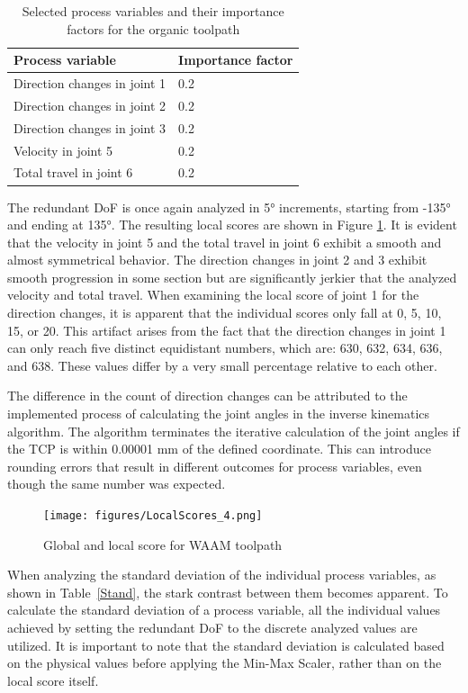 \begin{table}[H]
	\centering
	\caption{Selected process variables and their importance factors for the organic toolpath}
	\begin{tabular}{||l|l||}
		Process variable& Importance factor \\
		\hline
		\hline
		\hline
		Direction changes in joint 1	&		0.2 \\
		Direction changes in joint 2	&		0.2 \\
		Direction changes in joint 3	&		0.2 \\
		Velocity in joint 5	&		0.2 \\
		Total travel in joint 6	&		0.2 \\
		\hline
		\hline
	\end{tabular}
	
	
	\label{ravenparams}
\end{table}

The redundant \acrshort{DoF} is once again analyzed in 5° increments, starting from -135° and ending at 135°. The resulting local scores are shown in Figure \ref{LS4}. It is evident that the velocity in joint 5 and the total travel in joint 6 exhibit a smooth and almost symmetrical behavior. The direction changes in joint 2 and 3 exhibit smooth progression in some section but are significantly jerkier that the analyzed velocity and total travel. When examining the local score of joint 1 for the direction changes, it is apparent that the individual scores only fall at 0, 5, 10, 15, or 20. This artifact arises from the fact that the direction changes in joint 1 can only reach five distinct equidistant numbers, which are: 630, 632, 634, 636, and 638. These values differ by a very small percentage relative to each other.

The difference in the count of direction changes can be attributed to the implemented process of calculating the joint angles in the inverse kinematics algorithm. The algorithm terminates the iterative calculation of the joint angles if the \acrshort{TCP} is within 0.00001 mm of the defined coordinate. This can introduce rounding errors that result in different outcomes for process variables, even though the same number was expected.

\begin{figure}[H]
	\centerline{\texttt{[image: figures/LocalScores\_4.png]}}
	\caption{Global and local score for WAAM toolpath}
	\label{LS4}
\end{figure}

When analyzing the standard deviation of the individual process variables, as shown in Table~\ref{Stand}, the stark contrast between them becomes apparent. To calculate the standard deviation of a process variable, all the individual values achieved by setting the redundant \acrshort{DoF} to the discrete analyzed values are utilized. It is important to note that the standard deviation is calculated based on the physical values before applying the Min-Max Scaler, rather than on the local score itself.

